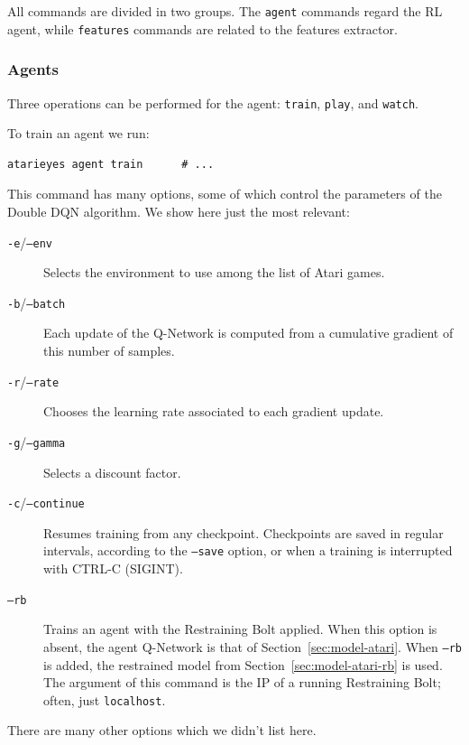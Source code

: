 All commands are divided in two groups. The \texttt{agent} commands regard the
RL agent, while \texttt{features} commands are related to the features
extractor.


\subsubsection*{Agents}

Three operations can be performed for the agent: \texttt{train},
\texttt{play}, and \texttt{watch}.

To train an agent we run:
\begin{verbatim}
atarieyes agent train      # ...
\end{verbatim}
This command has many options, some of which control the parameters of the
Double DQN algorithm. We show here just the most relevant:
\begin{description}
	\item [\texttt{-e}/\texttt{--env}] Selects the environment to use among the
		list of Atari games.
	\item [\texttt{-b}/\texttt{--batch}] Each update of the Q-Network is
		computed from a cumulative gradient of this number of samples.
	\item [\texttt{-r}/\texttt{--rate}] Chooses the learning rate associated
		to each gradient update.
	\item [\texttt{-g}/\texttt{--gamma}] Selects a discount factor.
	\item [\texttt{-c}/\texttt{--continue}] Resumes training from any
		checkpoint. Checkpoints are saved in regular intervals, according to the
		\texttt{--save} option, or when a training is interrupted with CTRL-C
		(SIGINT).
	\item [\texttt{--rb}] Trains an agent with the Restraining Bolt applied.
		When this option is absent, the agent Q-Network is that of
		Section~\ref{sec:model-atari}. When \texttt{--rb} is added, the
		restrained model from Section~\ref{sec:model-atari-rb} is used.
		The argument of this command is the IP of a running Restraining Bolt;
		often, just \texttt{localhost}.
\end{description}
There are many other options which we didn't list here.

